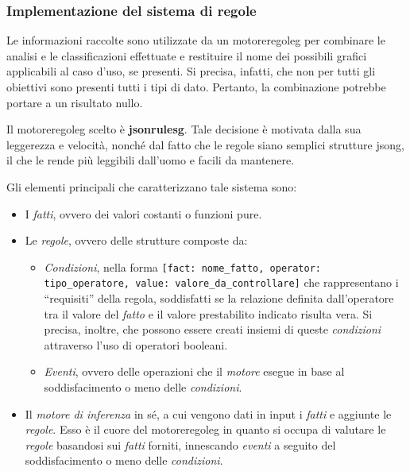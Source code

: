 \subsubsection{Implementazione del sistema di regole}\label{subsubsec:rules}
Le informazioni raccolte sono utilizzate da un \gls{motoreregoleg} per combinare le analisi e le classificazioni effettuate e restituire il nome dei possibili grafici applicabili al caso d'uso, se presenti.
Si precisa, infatti, che non per tutti gli obiettivi sono presenti tutti i tipi di dato. Pertanto, la combinazione potrebbe portare a un risultato nullo.

Il \gls{motoreregoleg} scelto è \textbf{\gls{jsonrulesg}}. Tale decisione è motivata dalla sua leggerezza e velocità, nonché dal fatto che le regole siano semplici strutture \gls{jsong}, 
il che le rende più leggibili dall'uomo e facili da mantenere.

\bigskip
\noindent Gli elementi principali che caratterizzano tale sistema sono:
\begin{itemize}
    \item I \emph{fatti}, ovvero dei valori costanti o funzioni pure.
    \item Le \emph{regole}, ovvero delle strutture composte da:
    \begin{itemize}
        \item \emph{Condizioni}, nella forma \texttt{[fact: nome\_fatto, operator: tipo\_operatore, value: valore\_da\_controllare]}
        che rappresentano i ``requisiti'' della regola, soddisfatti se la relazione definita dall'operatore tra il valore del \emph{fatto} e il valore prestabilito 
        indicato risulta vera. Si precisa, inoltre, che possono essere creati insiemi di queste \emph{condizioni} attraverso l'uso di operatori booleani.
        \item \emph{Eventi}, ovvero delle operazioni che il \emph{motore} esegue in base al soddisfacimento o meno delle \emph{condizioni}. 
    \end{itemize}
    \item Il \emph{motore di inferenza} in sé, a cui vengono dati in input i \emph{fatti} e aggiunte le \emph{regole}. Esso è il cuore del \gls{motoreregoleg} in quanto si occupa di valutare
    le \emph{regole} basandosi sui \emph{fatti} forniti, innescando \emph{eventi} a seguito del soddisfacimento o meno delle \emph{condizioni}.
\end{itemize}

